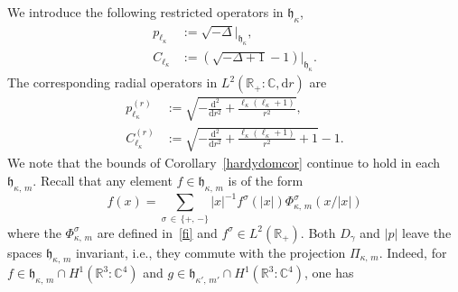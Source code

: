 \documentclass[10pt]{amsart}
\theoremstyle{definition}
\newcommand*\rd{\mathrm{d}}
\newcommand*\dr{\mathrm{d}r}
\newcommand*\cz{\mathbb{C}}
\newcommand*\rz{\mathbb{R}}
\newcommand*\gh{\mathfrak{h}}
\begin{document}
We introduce the following restricted operators in $\gh_{\kappa}$,
\begin{align*}
p_{\ell_\kappa} & := \sqrt{-\Delta}|_{\gh_{\kappa}},\\
C_{\ell_\kappa} & := \left(\sqrt{-\Delta+1}-1\right)\big|_{\gh_{\kappa}}.
\end{align*}
The corresponding radial operators in $L^2(\rz_+:\cz,\dr)$ are
\begin{align}\label{eq:radialkinetic}
p_{\ell_\kappa}^{(r)} & := \sqrt{ - \frac{\rd^2}{\dr^2} + \frac{\ell_\kappa\left(\ell_\kappa+1\right)}{r^2}},\\
C_{\ell_\kappa}^{(r)} & :=\sqrt{- \frac{\rd^2}{\dr^2} + \frac{\ell_\kappa\left(\ell_\kappa+1\right)}{r^2} + 1}-1.
\end{align}
We note that the bounds of Corollary~\ref{hardydomcor} continue to hold in each $\gh_{\kappa,\,m}$. Recall that any element $f\in\gh_{\kappa,\,m}$ is of the form
\[
f(x)=\sum_{\sigma\,\in\,\{+,\,-\}} |x|^{-1} f^\sigma(|x|)\Phi_{\kappa,\,m}^\sigma(x/|x|)
\]
where the $\Phi_{\kappa,\,m}^\sigma$ are defined in~\eqref{fi} and $f^\sigma\in L^2(\rz_+)$. Both $D_\gamma$ and $|p|$ leave the spaces $\gh_{\kappa,\,m}$ invariant, i.e., they commute with the projection $\Pi_{\kappa,\,m}$. Indeed, for $f\in\gh_{\kappa,\,m}\cap H^{1}(\rz^3:\cz^4)$ and $g\in\gh_{\kappa',\,m'}\cap H^{1}(\rz^3:\cz^4)$, one has
\end{document}
